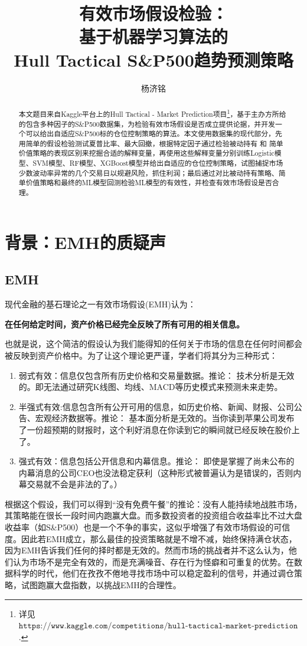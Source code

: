 \documentclass[11pt, a4paper]{article}
\title{有效市场假设检验：\\ 基于机器学习算法的\\Hull Tactical S\&P500趋势预测策略}
\author{杨济铭}
\date{}
\begin{document}
\maketitle

\begin{abstract}
    本文题目来自Kaggle平台上的Hull Tactical - Market Prediction项目\footnote{详见$\texttt{https://www.kaggle.com/competitions/hull-tactical-market-prediction}$.}，基于主办方所给的包含多种因子的S\&P500数据集，为检验有效市场假设是否成立提供论据，并开发一个可以给出自适应S\&P500标的仓位控制策略的算法。本文使用数据集的现代部分，先用简单的假设检验测试夏普比率、最大回撤，根据特定因子通过检验被动持有 和 简单价值策略的表现区别来挖掘合适的解释变量，再使用这些解释变量分别训练Logistic模型、SVM模型、RF模型、XGBoost模型并给出自适应的仓位控制策略，试图捕捉市场少数波动率异常的几个交易日以规避风险，抓住利润；最后通过对比被动持有策略、简单价值策略和最终的ML模型回测检验ML模型的有效性，并检查有效市场假设是否合理。
\end{abstract}

\clearpage
\tableofcontents
\clearpage

\section{背景：EMH的质疑声}
\subsection{EMH}
现代金融的基石理论之一有效市场假设(EMH)认为：
\begin{center}
    \textbf{在任何给定时间，资产价格已经完全反映了所有可用的相关信息。}
\end{center}
也就是说，这个简洁的假设认为我们能得知的任何关于市场的信息在任何时间都会被反映到资产价格中。为了让这个理论更严谨，学者们将其分为三种形式：
\begin{enumerate}
    \item 弱式有效：信息仅包含所有历史价格和交易量数据。推论： 技术分析是无效的。即无法通过研究K线图、均线、MACD等历史模式来预测未来走势。
    \item 半强式有效:信息包含所有公开可用的信息，如历史价格、新闻、财报、公司公告、宏观经济数据等。推论： 基本面分析是无效的。当你读到苹果公司发布了一份超预期的财报时，这个利好消息在你读到它的瞬间就已经反映在股价上了。
    \item 强式有效：信息包括公开信息和内幕信息。推论： 即使是掌握了尚未公布的内幕消息的公司CEO也没法稳定获利（这种形式被普遍认为是错误的，否则内幕交易就不会是非法的了。）
\end{enumerate}
根据这个假设，我们可以得到“没有免费午餐”的推论：没有人能持续地战胜市场，其策略能在很长一段时间内跑赢大盘。而多数投资者的投资组合收益率比不过大盘收益率（如S\&P500）也是一个不争的事实，这似乎增强了有效市场假设的可信度。因此若EMH成立，那么最佳的投资策略就是不增不减，始终保持满仓状态，因为EMH告诉我们任何的择时都是无效的。然而市场的挑战者并不这么认为，他们认为市场不是完全有效的，而是充满噪音、存在行为怪癖和可重复的优势。在数据科学的时代，他们在孜孜不倦地寻找市场中可以稳定盈利的信号，并通过调仓策略，试图跑赢大盘指数，以挑战EMH的合理性。
\end{document}

